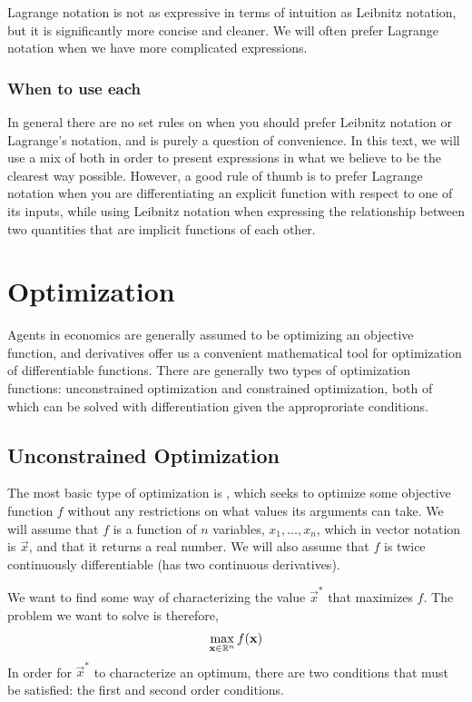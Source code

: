 Lagrange notation is not as expressive in terms of intuition as Leibnitz notation, but it is significantly more concise and cleaner. We will often prefer Lagrange notation when we have more complicated expressions.

\subsubsection*{When to use each}
In general there are no set rules on when you should prefer Leibnitz notation or Lagrange's notation, and is purely a question of convenience. In this text, we will use a mix of both in order to present expressions in what we believe to be the clearest way possible. However, a good rule of thumb is to prefer Lagrange notation when you are differentiating an explicit function with respect to one of its inputs, while using Leibnitz notation when expressing the relationship between two quantities that are implicit functions of each other. 

\section{Optimization}
Agents in economics are generally assumed to be optimizing an objective function, and derivatives offer us a convenient mathematical tool for optimization of differentiable functions. There are generally two types of optimization functions: unconstrained optimization and constrained optimization, both of which can be solved with differentiation given the approproriate conditions.

\subsection*{Unconstrained Optimization}
The most basic type of optimization is , which seeks to optimize some objective function $f$ without any restrictions on what values its arguments can take. We will assume that $f$ is a function of $n$ variables, $x_1, \dots, x_n$, which in vector notation is $\vec{x}$, and that it returns a real number. We will also assume that $f$ is twice continuously differentiable (has two continuous derivatives). 

We want to find some way of characterizing the value $\vec{x}^*$ that maximizes $f$. The problem we want to solve is therefore,
\begin{align*}
    \max_{\mathbf{x} \in \mathbb{R}^n} f(\mathbf{x})
\end{align*}
In order for $\vec{x}^*$ to characterize an optimum, there are two conditions that must be satisfied: the first and second order conditions. 

